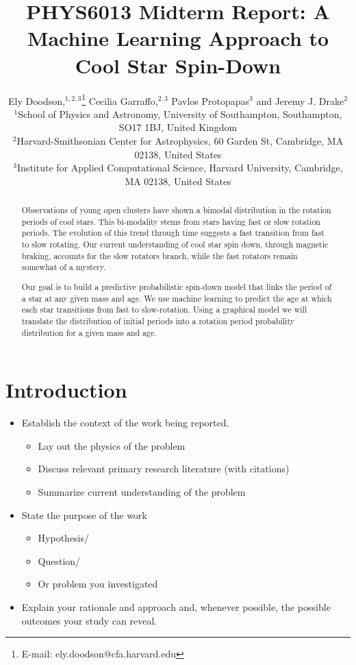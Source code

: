 \documentclass[fleqn,usenatbib]{mnras}
\title{PHYS6013 Midterm Report: A Machine Learning Approach to Cool Star Spin-Down}
\author[E. Doodson et al.]{
Ely Doodson,$^{1,2,3}$\thanks{E-mail: ely.doodson@cfa.harvard.edu}
Cecilia Garraffo,$^{2,3}$
Pavlos Protopapas$^{3}$
and Jeremy J. Drake$^{2}$
\\
$^{1}$School of Physics and Astronomy, University of Southampton,
Southampton, SO17 1BJ, United Kingdom\\
$^{2}$Harvard-Smithsonian Center for Astrophysics, 60 Garden St, Cambridge, MA 02138, United States \\
$^{3}$Institute for Applied Computational Science, Harvard University, Cambridge, MA 02138, United States
}
\begin{document}
\label{firstpage}
\pagerange{\pageref{firstpage}--\pageref{lastpage}}
\maketitle

\begin{abstract}
	Observations of young open clusters have shown a bimodal distribution in the rotation
	periods of cool stars.
	This bi-modality stems from stars having fast or slow rotation periods.
	The evolution of this trend through time suggests a fast transition from fast to slow rotating.
	Our current understanding of cool star spin down, through magnetic braking, accounts for the slow rotators branch, while the fast rotators  remain somewhat of a mystery.

	Our goal is to build a predictive probabilistic spin-down model that links the period of a star at any given mass and age.
	We use machine learning to predict the age at which each star transitions from fast to slow-rotation.
	Using a graphical model we will translate the distribution of initial periods into a rotation period probability distribution for a given mass and age.
\end{abstract}


\section{Introduction}
\begin{itemize}

	\item Establish the context of the work being reported.
	      \begin{itemize}
		      \item Lay out the physics of the problem
		      \item Discuss relevant primary research literature (with citations)
		      \item Summarize current understanding of the problem
	      \end{itemize}

	\item State the purpose of the work
	      \begin{itemize}
		      \item Hypothesis/
		      \item Question/
		      \item Or problem you investigated
	      \end{itemize}

	\item Explain your rationale and approach and, whenever possible, the possible outcomes your study can reveal.

\end{itemize}
\end{document}

